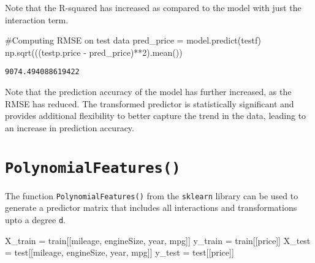 \documentclass[
  letterpaper,
  DIV=11,
  numbers=noendperiod]{scrreprt}
\newenvironment{Shaded}{\begin{snugshade}}{\end{snugshade}}
\newcommand{\CommentTok}[1]{\textcolor[rgb]{0.37,0.37,0.37}{#1}}
\newcommand{\DecValTok}[1]{\textcolor[rgb]{0.68,0.00,0.00}{#1}}
\newcommand{\NormalTok}[1]{\textcolor[rgb]{0.00,0.23,0.31}{#1}}
\newcommand{\OperatorTok}[1]{\textcolor[rgb]{0.37,0.37,0.37}{#1}}
\newcommand{\StringTok}[1]{\textcolor[rgb]{0.13,0.47,0.30}{#1}}
\begin{document}
Note that the R-squared has increased as compared to the model with just
the interaction term.

\begin{Shaded}
\begin{Highlighting}[]
\CommentTok{\#Computing RMSE on test data}
\NormalTok{pred\_price }\OperatorTok{=}\NormalTok{ model.predict(testf)}
\NormalTok{np.sqrt(((testp.price }\OperatorTok{{-}}\NormalTok{ pred\_price)}\OperatorTok{**}\DecValTok{2}\NormalTok{).mean())}
\end{Highlighting}
\end{Shaded}

\begin{verbatim}
9074.494088619422
\end{verbatim}

Note that the prediction accuracy of the model has further increased, as
the RMSE has reduced. The transformed predictor is statistically
significant and provides additional flexibility to better capture the
trend in the data, leading to an increase in prediction accuracy.

\section{\texorpdfstring{\texttt{PolynomialFeatures()}}{PolynomialFeatures()}}\label{polynomialfeatures}

The function \texttt{PolynomialFeatures()} from the \texttt{sklearn}
library can be used to generate a predictor matrix that includes all
interactions and transformations upto a degree \texttt{d}.

\begin{Shaded}
\begin{Highlighting}[]
\NormalTok{X\_train }\OperatorTok{=}\NormalTok{ train[[}\StringTok{\textquotesingle{}mileage\textquotesingle{}}\NormalTok{, }\StringTok{\textquotesingle{}engineSize\textquotesingle{}}\NormalTok{, }\StringTok{\textquotesingle{}year\textquotesingle{}}\NormalTok{, }\StringTok{\textquotesingle{}mpg\textquotesingle{}}\NormalTok{]]}
\NormalTok{y\_train }\OperatorTok{=}\NormalTok{ train[[}\StringTok{\textquotesingle{}price\textquotesingle{}}\NormalTok{]]}
\NormalTok{X\_test }\OperatorTok{=}\NormalTok{ test[[}\StringTok{\textquotesingle{}mileage\textquotesingle{}}\NormalTok{, }\StringTok{\textquotesingle{}engineSize\textquotesingle{}}\NormalTok{, }\StringTok{\textquotesingle{}year\textquotesingle{}}\NormalTok{, }\StringTok{\textquotesingle{}mpg\textquotesingle{}}\NormalTok{]]}
\NormalTok{y\_test }\OperatorTok{=}\NormalTok{ test[[}\StringTok{\textquotesingle{}price\textquotesingle{}}\NormalTok{]]}
\end{Highlighting}
\end{Shaded}
\end{document}
